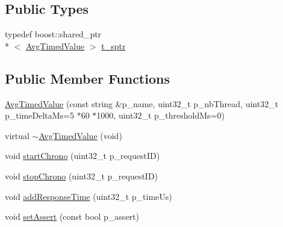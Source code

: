 \subsection*{Public Types}
\begin{DoxyCompactItemize}
\item 
typedef boost\-::shared\-\_\-ptr\\*
$<$ \hyperlink{classxtd_1_1counters_1_1AvgTimedValue}{Avg\-Timed\-Value} $>$ \hyperlink{classxtd_1_1counters_1_1AvgTimedValue_a68434add28044efc37c616ec7002d0f8}{t\-\_\-sptr}
\end{DoxyCompactItemize}
\subsection*{Public Member Functions}
\begin{DoxyCompactItemize}
\item 
\hyperlink{classxtd_1_1counters_1_1AvgTimedValue_a2c4e692d5e33a1155d7c869be55af0de}{Avg\-Timed\-Value} (const string \&p\-\_\-name, uint32\-\_\-t p\-\_\-nb\-Thread, uint32\-\_\-t p\-\_\-time\-Delta\-Ms=5 $\ast$60 $\ast$1000, uint32\-\_\-t p\-\_\-threshold\-Ms=0)
\item 
virtual \hyperlink{classxtd_1_1counters_1_1AvgTimedValue_a08aa140f45a1160943a494e5eab59aa7}{$\sim$\-Avg\-Timed\-Value} (void)
\item 
void \hyperlink{classxtd_1_1counters_1_1AvgTimedValue_ab5b5b6e1b4dae4bb4172ebc11ffc7c91}{start\-Chrono} (uint32\-\_\-t p\-\_\-request\-I\-D)
\item 
void \hyperlink{classxtd_1_1counters_1_1AvgTimedValue_a9a6818ff8c4f882a1445e9c49ed79e0f}{stop\-Chrono} (uint32\-\_\-t p\-\_\-request\-I\-D)
\item 
void \hyperlink{classxtd_1_1counters_1_1AvgTimedValue_a8d3f9dbf787c7c307957038a879fb69a}{add\-Response\-Time} (uint32\-\_\-t p\-\_\-time\-Us)
\item 
void \hyperlink{classxtd_1_1counters_1_1AvgTimedValue_a789b1bdb5596f6cb332435892411dbb0}{set\-Assert} (const bool p\-\_\-assert)
\end{DoxyCompactItemize}
